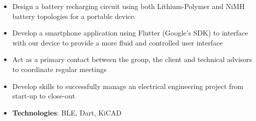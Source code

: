 \documentclass[10pt, letterpaper, ragged2e, withhyper]{altacv}
\begin{document}
\begin{paracol}{2}
            
    
    \begin{itemize}
        \item Design a battery recharging circuit using both Lithium-Polymer and NiMH battery topologies for a portable device. 
        \item Develop a smartphone application using Flutter (Google's SDK) to interface with our device to provide a more fluid and controlled user interface
        \item Act as a primary contact between the group, the client and technical advisors to coordinate regular meetings 
        \item Develop skills to successfully manage an electrical engineering project from start-up to close-out
        \item \textbf{Technologies}: BLE, Dart, KiCAD
    \end{itemize}

\switchcolumn







    

\end{paracol}
\end{document}
